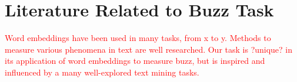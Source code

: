 \chapter{Literature Related to Buzz Task}
\label{sec:literature-buzz}

\textcolor{red}{Word embeddings have been used in many tasks, from x to y. Methods to measure various phenomena in text are well researched. Our task is ?unique? in its application of word embeddings to measure buzz, but is inspired and influenced by a many well-explored text mining tasks.}